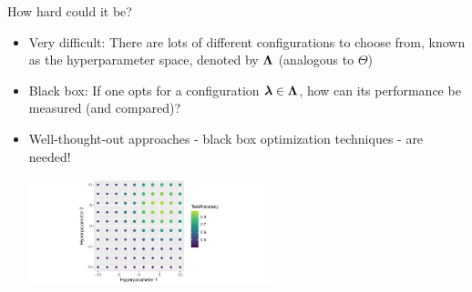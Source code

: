 \documentclass[11pt,compress,t,notes=noshow, xcolor=table]{beamer}
\begin{document}
\begin{vbframe}{How hard could it be?}
\begin{itemize}
\item \small Very difficult: There are lots of different configurations to choose from, known as the hyperparameter space, denoted by $\bm{\Lambda}$ (analogous to $\Theta$)
\item \small Black box: If one opts for a configuration $\bm{\lambda} \in \bm{\Lambda}$, how can its performance be measured (and compared)?
\item \small Well-thought-out approaches - black box optimization techniques - are needed!

\begin{center}
\vspace{2em}
\includegraphics[width=200pt]{figure/cart_tuning_balgos_1.pdf}
\end{center}

\end{itemize}
\end{vbframe}
\end{document}
